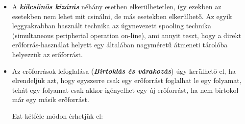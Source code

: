 \documentclass[tikz,12pt,margin=0px]{article}
\begin{document}
    \begin{itemize}[topsep=8pt,itemsep=4pt,partopsep=4pt, parsep=4pt]
        \item A \emph{\textbf{kölcsönös kizárás}} néhány esetben elkerülhetetlen, így ezekben az esetekben nem lehet mit csinálni, de más esetekben elkerülhető. Az egyik leggyakrabban használt technika az úgynevezett spooling technika (simultaneous peripherial operation on-line), ami annyit teszt, hogy a direkt erőforrás-használat helyett egy általában nagyméretű átmeneti tárolóba helyezzük az erőforrást.
        \item Az erőforrások lefoglalása (\emph{\textbf{Birtoklás és várakozás}}) úgy kerülhető el, ha elrendeljük azt, hogy egyszerre csak egy erőforrást foglalhat le egy folyamat, tehát egy folyamat csak akkor igényelhet egy új erőforrást, ha nem birtokol már egy másik erőforrást.

            \noindent Ezt kétféle módon érhetjük el:


\end{itemize}
\end{document}
